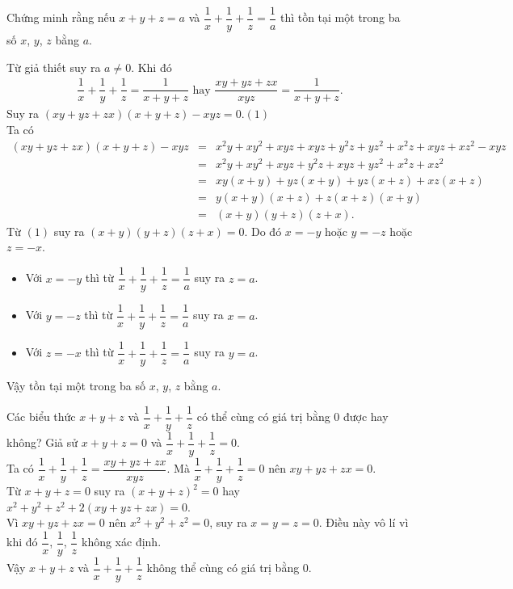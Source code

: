 \begin{bt}%
 Chứng minh rằng nếu $x+y+z=a$ và $\dfrac{1}{x}+ \dfrac{1}{y} + \dfrac{1}{z} = \dfrac{1}{a}$ thì tồn tại một trong ba số $x$, $y$, $z$ bằng $a$.
 \loigiai
  {
  Từ giả thiết suy ra $a \neq 0$. Khi đó
  \allowdisplaybreaks
  \begin{eqnarray*}
   \dfrac{1}{x}+\dfrac{1}{y}+\dfrac{1}{z}=\dfrac{1}{x+y+z} \text{ hay } \dfrac{xy+yz+zx}{xyz} = \dfrac{1}{x+y+z}.
  \end{eqnarray*}
  Suy ra $(xy+yz+zx)(x+y+z)-xyz=0$.\hfill $(1)$\\
  Ta có
  \allowdisplaybreaks
  \begin{eqnarray*}
   (xy+yz+zx)(x+y+z) - xyz &=& x^2y+xy^2+xyz+xyz+y^2z+yz^2+x^2z+xyz+xz^2-xyz\\
   &=& x^2y+xy^2+xyz+y^2z+xyz+yz^2+x^2z+xz^2\\
   &=& xy(x+y) + yz(x+y) + yz(x+z) + xz(x+z)\\
   &=& y(x+y)(x+z)+z(x+z)(x+y)\\
   &=& (x+y)(y+z)(z+x).
  \end{eqnarray*}
  Từ $(1)$ suy ra $(x+y)(y+z)(z+x)=0$. Do đó $x=-y$ hoặc $y=-z$ hoặc $z=-x$.
  \begin{itemize}
   \item Với $x=-y$ thì từ $\dfrac{1}{x}+\dfrac{1}{y}+\dfrac{1}{z}=\dfrac{1}{a}$ suy ra $z=a$.
   \item Với $y=-z$ thì từ $\dfrac{1}{x}+\dfrac{1}{y}+\dfrac{1}{z}=\dfrac{1}{a}$ suy ra $x=a$.
   \item Với $z=-x$ thì từ $\dfrac{1}{x}+\dfrac{1}{y}+\dfrac{1}{z}=\dfrac{1}{a}$ suy ra $y=a$.
  \end{itemize}
  Vậy tồn tại một trong ba số $x$, $y$, $z$ bằng $a$.
  }
\end{bt}

\begin{bt}%
 Các biểu thức $x+y+z$ và $\dfrac{1}{x}+\dfrac{1}{y}+\dfrac{1}{z}$ có thể cùng có giá trị bằng $0$ được hay không?
 \loigiai
  {
  Giả sử $x+y+z=0$ và $\dfrac{1}{x}+\dfrac{1}{y}+\dfrac{1}{z}=0$.\\
  Ta có $\dfrac{1}{x}+\dfrac{1}{y}+\dfrac{1}{z} = \dfrac{xy+yz+zx}{xyz}$. Mà $\dfrac{1}{x}+\dfrac{1}{y}+\dfrac{1}{z}=0$ nên $xy+yz+zx=0$.\\
  Từ $x+y+z=0$ suy ra $(x+y+z)^2=0$ hay $x^2+y^2+z^2+2(xy+yz+zx)=0$.\\
  Vì $xy+yz+zx=0$ nên $x^2+y^2+z^2=0$, suy ra $x=y=z=0$. Điều này vô lí vì khi đó $\dfrac{1}{x}$, $\dfrac{1}{y}$, $\dfrac{1}{z}$ không xác định.\\
  Vậy $x+y+z$ và $\dfrac{1}{x}+\dfrac{1}{y}+\dfrac{1}{z}$ không thể cùng có giá trị bằng $0$.
  }
\end{bt}

